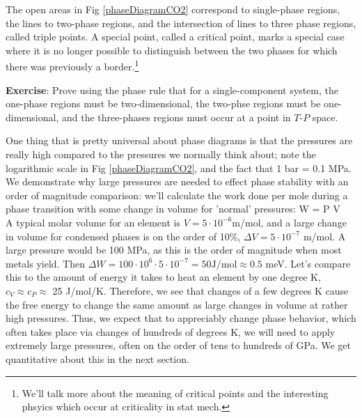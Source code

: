 \documentclass[12pt]{article}
\begin{document}
The open areas in Fig \ref{phaseDiagramCO2} correspond to single-phase regions, the lines to two-phase regions, and the intersection of lines to three phase regions, called triple points. A special point, called a critical point, marks a special case where it is no longer possible to distinguish between the two phases for which there was previously a border.\footnote{We'll talk more about the meaning of critical points and the interesting phsyics which occur at criticality in stat mech.} 

\textbf{Exercise}: Prove using the phase rule that for a single-component system, the one-phase regions must be two-dimensional, the two-phse regions must be one-dimensional, and the three-phases regions must occur at a point in $T$-$P$ space.

One thing that is pretty universal about phase diagrams is that the pressures are really high compared to the pressures we normally think about; note the logarithmic scale in Fig \ref{phaseDiagramCO2}, and the fact that 1 bar = 0.1 MPa. We demonstrate why large pressures are needed to effect phase stability with an order of magnitude comparison: we'll calculate the work done per mole during a phase transition with some change in volume for 'normal' pressures:
\eqs
\Delta W = P \cdot \Delta V\\
\eqe
A typical molar volume for an element is $V = 5 \cdot 10^{-6}$m\three/mol, and a large change in volume for condensed phases is on the order of 10\%, $\Delta V = 5 \cdot 10^{-7}$ m\three/mol. A large pressure would be 100 MPa, as this is the order of magnitude when most metals yield. Then $\Delta W = 100\cdot 10^{6} \cdot 5 \cdot 10^{-7} = 50 \text{J/mol} \approx 0.5$ meV. Let's compare this to the amount of energy it takes to heat an element by one degree K, $c_V\approx c_P \approx$ 25 J/mol/K. Therefore, we see that changes of a few degrees K cause the free energy to change the same amount as large changes in volume at rather high pressures. Thus, we expect that to appreciably change phase behavior, which often takes place via changes of hundreds of degrees K, we will need to apply extremely large pressures, often on the order of tens to hundreds of GPa. We get quantitative about this in the next section.
\end{document}
